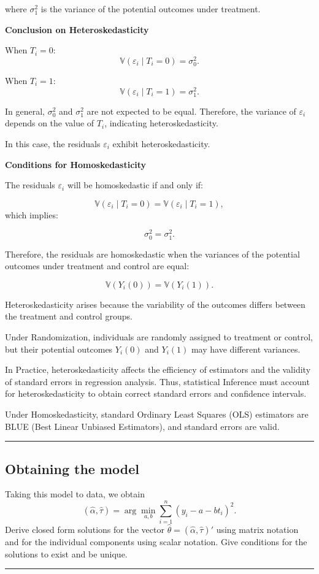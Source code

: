 \documentclass{article}
\newenvironment{colorparagraph}[1]{\par\color{#1}}{\par}
\begin{document}
where \(\sigma_1^2\) is the variance of the potential outcomes under treatment.

\textbf{Conclusion on Heteroskedasticity}

When \(T_i = 0\):
\[
\mathbb{V}(\varepsilon_i \mid T_i = 0) = \sigma_0^2.
\]

When \(T_i = 1\):
\[
\mathbb{V}(\varepsilon_i \mid T_i = 1) = \sigma_1^2.
\]

In general, \(\sigma_0^2\) and \(\sigma_1^2\) are not expected to be equal. Therefore, the variance of \(\varepsilon_i\) depends on the value of \(T_i\), indicating heteroskedasticity.

In this case, the residuals \(\varepsilon_i\) exhibit heteroskedasticity.

\textbf{Conditions for Homoskedasticity}

The residuals \(\varepsilon_i\) will be homoskedastic if and only if:

\[
\mathbb{V}(\varepsilon_i \mid T_i = 0) = \mathbb{V}(\varepsilon_i \mid T_i = 1),
\]
which implies:

\[
\sigma_0^2 = \sigma_1^2.
\]

Therefore, the residuals are homoskedastic when the variances of the potential outcomes under treatment and control are equal:

\[
\mathbb{V}(Y_i(0)) = \mathbb{V}(Y_i(1)).
\]

Heteroskedasticity arises because the variability of the outcomes differs between the treatment and control groups.

Under Randomization, individuals are randomly assigned to treatment or control, but their potential outcomes \(Y_i(0)\) and \(Y_i(1)\) may have different variances.

In Practice, heteroskedasticity affects the efficiency of estimators and the validity of standard errors in regression analysis. Thus, statistical Inference must account for heteroskedasticity to obtain correct standard errors and confidence intervals.

Under Homoskedasticity, standard Ordinary Least Squares (OLS) estimators are BLUE (Best Linear Unbiased Estimators), and standard errors are valid.

\begin{colorparagraph}{questioncolor}
\rule{\textwidth}{0.5pt}

\label{q2c}\subsection{Obtaining the model}
Taking this model to data, we obtain
\[
(\hat{\alpha}, \hat{\tau}) = \arg\min_{a,b} \sum_{i=1}^{n} (y_i - a - bt_i)^2.
\]
Derive closed form solutions for the vector \(\hat{\theta} = (\hat{\alpha}, \hat{\tau})'\) using matrix notation and for the individual components using scalar notation. Give conditions for the solutions to exist and be unique.

\rule{\textwidth}{0.5pt}
\end{colorparagraph}
\end{document}
